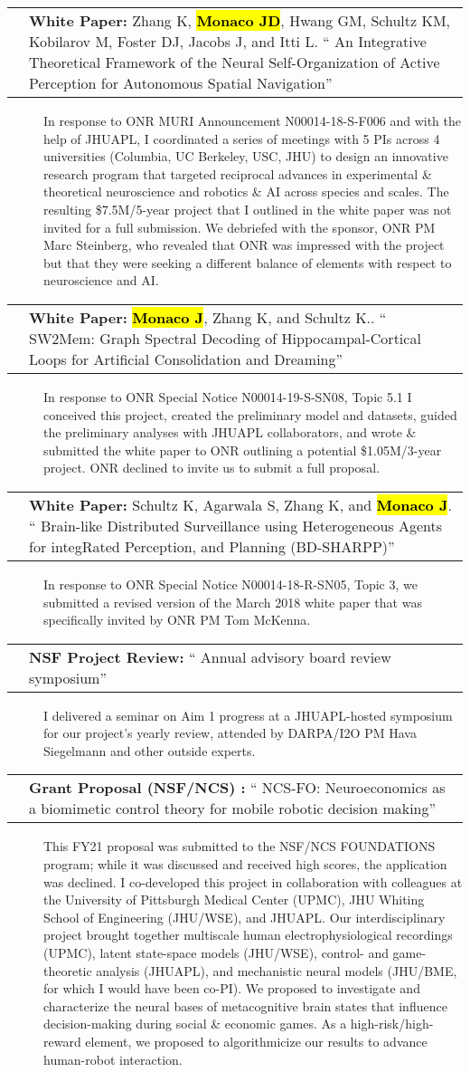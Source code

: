 \documentclass[10pt]{article}
\makeatletter
\newcommand{\unpubtitle}[1]{{\color{hopkinsblue} #1}}
\newcommand{\joehl}[1]{\hl{\textbf{#1}}}
\newcommand{\researchnote}[1]{
  \begin{description}
    \item[] {\hspace{2.2ex}\color{darkgray} #1}
  \end{description}
}
\newcommand{\researchactivity}[4]{
  \begin{minipage}[t]{\textwidth}
    \begin{tabular}{@{\hspace{2ex}}l>{\raggedright\arraybackslash}p{.8\textwidth}}
      \makebox[1.2in][l]{#1} & \textbf{#2:}
      ``\unpubtitle{#3}'' 
    \end{tabular}
  \researchnote{\hspace{1ex} #4}
  \end{minipage}
  \medbreak
}
\newcommand{\whitepaper}[4]{
  \begin{minipage}[t]{\textwidth}
    \begin{tabular}{@{\hspace{2ex}}l>{\raggedright\arraybackslash}p{.8\textwidth}}
      \makebox[1.2in][l]{#1} & \textbf{White Paper:} #2.
      ``\unpubtitle{#3}'' 
    \end{tabular}
  \researchnote{\hspace{1ex} #4}
  \end{minipage}
  \medbreak
}
\makeatother
\begin{document}
\whitepaper
{May--June 2018}
{Zhang K, \joehl{Monaco JD}, Hwang GM, Schultz KM, Kobilarov M, Foster DJ,
Jacobs J, and Itti L}
{An Integrative Theoretical Framework of the Neural Self-Organization of Active
Perception for Autonomous Spatial Navigation}
{In response to ONR MURI Announcement N00014-18-S-F006 and with the help of
  JHUAPL, I coordinated a series of meetings with 5 PIs across 4 universities
  (Columbia, UC Berkeley, USC, JHU) to design an innovative research program that
  targeted reciprocal advances in experimental \& theoretical neuroscience and
  robotics \& AI across species and scales. The resulting \$7.5M/5-year project
  that I outlined in the white paper was not invited for a full submission. We
  debriefed with the sponsor, ONR PM Marc Steinberg, who revealed that ONR was
  impressed with the project but that they were seeking a different balance of
elements with respect to neuroscience and AI.}

\whitepaper
{August 2019}
{\joehl{Monaco J}, Zhang K, and Schultz K.}
{SW2Mem: Graph Spectral Decoding of Hippocampal-Cortical Loops for Artificial
Consolidation and Dreaming}
{In response to ONR Special Notice N00014-19-S-SN08, Topic 5.1 I conceived this
  project, created the preliminary model and datasets, guided the preliminary
  analyses with JHUAPL collaborators, and wrote \& submitted the white paper to
  ONR outlining a potential \$1.05M/3-year project. ONR declined to invite us to
submit a full proposal.}

\whitepaper
{August 2019}
{Schultz K, Agarwala S, Zhang K, and \joehl{Monaco J}}
{Brain-like Distributed Surveillance using Heterogeneous Agents for integRated
Perception, and Planning (BD-SHARPP)}
{In response to ONR Special Notice N00014-18-R-SN05, Topic 3, we submitted a
  revised version of the March 2018 white paper that was specifically invited by
ONR PM Tom McKenna.}

\researchactivity
{Sept. 11, 2019}
{NSF Project Review}
{Annual advisory board review symposium}
{I delivered a seminar on Aim 1 progress at a JHUAPL-hosted symposium for our
  project’s yearly review, attended by DARPA/I2O PM Hava Siegelmann and other
outside experts.}

\researchactivity
{Feb. 26, 2020}
{Grant Proposal (NSF/NCS) }
{NCS-FO: Neuroeconomics as a biomimetic control theory for mobile robotic
decision making}
{This FY21 proposal was submitted to the NSF/NCS FOUNDATIONS program; while
  it was discussed and received high scores, the application was declined. I
  co-developed this project in collaboration with colleagues at the University of
  Pittsburgh Medical Center (UPMC), JHU Whiting School of Engineering (JHU/WSE),
  and JHUAPL. Our interdisciplinary project brought together multiscale human
  electrophysiological recordings (UPMC), latent state-space models (JHU/WSE),
  control- and game-theoretic analysis (JHUAPL), and mechanistic neural models
  (JHU/BME, for which I would have been co-PI). We proposed to investigate and
  characterize the neural bases of metacognitive brain states that influence
  decision-making during social \& economic games. As a high-risk/high-reward
  element, we proposed to algorithmicize our results to advance human-robot
interaction.}
\end{document}
